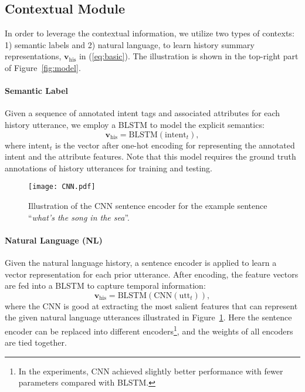\documentclass[11pt,letterpaper]{article}
\begin{document}
\subsection{Contextual Module}
\label{ssec:contexualmodel}

In order to leverage the contextual information, we utilize two types of contexts: 1) semantic labels and 2) natural language, to learn history summary representations, $\textbf{v}_\text{his}$ in (\ref{eq:basic}).
The illustration is shown in the top-right part of Figure~\ref{fig:model}.

\paragraph{Semantic Label}
Given a sequence of annotated intent tags and associated attributes for each history utterance, we employ a BLSTM to model the explicit semantics:
\begin{equation}
\textbf{v}_\text{his} = \text{BLSTM}(\text{intent}_t),
\label{eq:tag}
\end{equation}
where $\text{intent}_t$ is the vector after one-hot encoding for representing the annotated intent and the attribute features.
Note that this model requires the ground truth annotations of history utterances for training and testing.

\begin{figure}[t]
\centering
\texttt{[image: CNN.pdf]}
\vspace{-3mm}
\caption{Illustration of the CNN sentence encoder for the example sentence ``\textit{what's the song in the sea}''.}
\label{fig:cnn}
\end{figure}

\paragraph{Natural Language (NL)}
Given the natural language history, a sentence encoder is applied to learn a vector representation for each prior utterance.
After encoding, the feature vectors are fed into a BLSTM to capture temporal information:
\begin{equation}
\textbf{v}_\text{his} = \text{BLSTM}(\text{CNN}(\text{utt}_t)),
\label{eq:nl}
\end{equation}
where the CNN is good at extracting the most salient features that can represent the given natural language utterances illustrated in Figure~\ref{fig:cnn}.
Here the sentence encoder can be replaced into different encoders\footnote{In the experiments, CNN achieved slightly better performance with fewer parameters compared with BLSTM.}, and the weights of all encoders are tied together.
\end{document}
